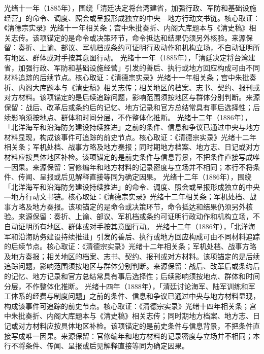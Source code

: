 光绪十一年（1885年），围绕「清廷决定将台湾建省，加强行政、军防和基础设施经营」的命令、调度、照会或呈报形成独立的中央—地方行动文书链。核心取证：《清德宗实录》光绪十一年相关条；宫中朱批奏折、内阁大库题本与《清史稿》相关志传。该项锚定的是命令或决策环节，命令抵达和结果仍须另外核验。来源保留：奏折、上谕、部议、军机档或条约可证明行政动作和机构立场，不自动证明所有地区、群体或对手按其意图行动。
光绪十一年（1885年），「清廷决定将台湾建省，加强行政、军防和基础设施经营」引发的善后、执行或地方回应构成可由不同材料追踪的后续节点。核心取证：《清德宗实录》光绪十一年相关条；宫中朱批奏折、内阁大库题本与《清史稿》相关志传；相关地区的档案、志书、契约、报刊或对方材料。该项锚定的是后续追踪问题，影响范围须按地区与群体分别判断。来源保留：战后、改革后或条约后的记忆、地方记录和官方总结常具有事后选择性；后续影响须按地点、群体和时间分层，不作整体化推断。
光绪十二年（1886年），「北洋海军和沿海防务建设持续推进」之前的条件、信息和争议已通过中央与地方材料显现，构成该事件可追踪的前史节点。核心取证：《清德宗实录》光绪十二年相关条；军机处档、战事方略及地方奏报；同时期地方档案、地方志、日记或对方材料应按具体地区补检。该项锚定的是前史条件与信息背景，不把条件直接写成唯一因果。来源保留：官修编年和地方材料的记录密度与立场并不相同；本行不将条件、传闻、呈报或后见解释直接等同为确定因果。
光绪十二年（1886年），围绕「北洋海军和沿海防务建设持续推进」的命令、调度、照会或呈报形成独立的中央—地方行动文书链。核心取证：《清德宗实录》光绪十二年相关条；军机处档、战事方略及地方奏报。该项锚定的是命令或决策环节，命令抵达和结果仍须另外核验。来源保留：奏折、上谕、部议、军机档或条约可证明行政动作和机构立场，不自动证明所有地区、群体或对手按其意图行动。
光绪十二年（1886年），「北洋海军和沿海防务建设持续推进」引发的善后、执行或地方回应构成可由不同材料追踪的后续节点。核心取证：《清德宗实录》光绪十二年相关条；军机处档、战事方略及地方奏报；相关地区的档案、志书、契约、报刊或对方材料。该项锚定的是后续追踪问题，影响范围须按地区与群体分别判断。来源保留：战后、改革后或条约后的记忆、地方记录和官方总结常具有事后选择性；后续影响须按地点、群体和时间分层，不作整体化推断。
光绪十四年（1888年），「清廷讨论海军、陆军训练和军工体系的经费与制度问题」之前的条件、信息和争议已通过中央与地方材料显现，构成该事件可追踪的前史节点。核心取证：《清德宗实录》光绪十四年相关条；宫中朱批奏折、内阁大库题本与《清史稿》相关志传；同时期地方档案、地方志、日记或对方材料应按具体地区补检。该项锚定的是前史条件与信息背景，不把条件直接写成唯一因果。来源保留：官修编年和地方材料的记录密度与立场并不相同；本行不将条件、传闻、呈报或后见解释直接等同为确定因果。
